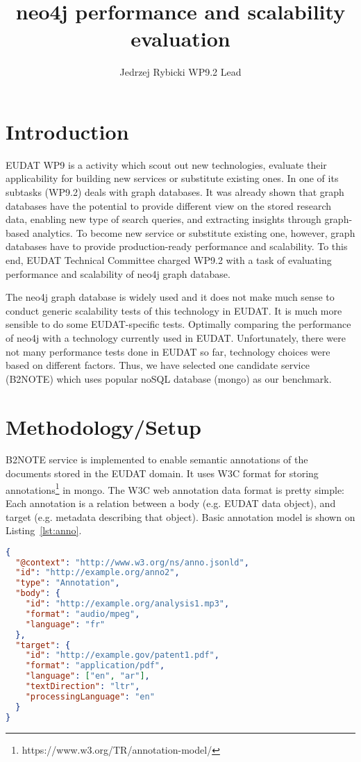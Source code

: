 \documentclass[a4paper,10pt]{article}
\title{neo4j performance and scalability evaluation}
\author{Jedrzej Rybicki WP9.2 Lead}
\begin{document}
\maketitle

\section{Introduction}
EUDAT WP9 is a activity which scout out new technologies, evaluate their 
applicability for building new services or substitute existing ones. In one of 
its subtasks (WP9.2) deals with graph databases. It was already shown that 
graph databases have the potential to provide different view on the stored 
research data, enabling new type of search queries, and extracting insights 
through graph-based analytics. To become new service or substitute existing
one, however, graph databases have to provide production-ready performance and
scalability. To this end, EUDAT Technical Committee charged WP9.2 with a task 
of evaluating performance and scalability of neo4j graph database.

The neo4j graph database is widely used and it does not make much sense to 
conduct generic scalability tests of this technology in EUDAT. It is much more 
sensible to do some EUDAT-specific tests. Optimally comparing the performance of 
neo4j with a technology currently used in EUDAT. Unfortunately, there were not 
many performance tests done in EUDAT so far, technology choices were based on 
different factors. Thus, we have selected one candidate service (B2NOTE) which 
uses popular noSQL database (mongo) as our benchmark. 

\section{Methodology/Setup}
B2NOTE service is implemented to enable semantic annotations of the documents 
stored in the EUDAT domain. It uses W3C format for storing 
annotations\footnote{https://www.w3.org/TR/annotation-model/} in mongo. The W3C 
web annotation data format is pretty simple: Each annotation is a relation 
between a body (e.g. EUDAT data object), and target (e.g. metadata describing 
that object). Basic annotation model is shown on Listing~\ref{lst:anno}.

\begin{lstlisting}[language=json,frame=single,caption=Basic W3C annotation data model,label=lst:anno]
{
  "@context": "http://www.w3.org/ns/anno.jsonld",
  "id": "http://example.org/anno2",
  "type": "Annotation",
  "body": {
    "id": "http://example.org/analysis1.mp3",
    "format": "audio/mpeg",
    "language": "fr"
  },
  "target": {
    "id": "http://example.gov/patent1.pdf",
    "format": "application/pdf",
    "language": ["en", "ar"],
    "textDirection": "ltr",
    "processingLanguage": "en"
  }
}
\end{lstlisting}
\end{document}
